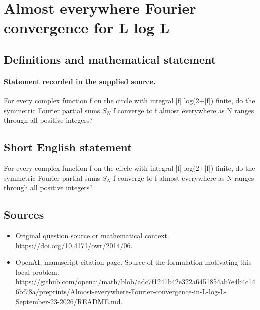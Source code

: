 \documentclass[11pt]{article}
\begin{document}
\section*{Almost everywhere Fourier convergence for L log L}\label{statement}
\subsection{Definitions and mathematical statement}
\paragraph{Statement recorded in the supplied source.}
For every complex function f on the circle with integral |f| log(2+|f|) finite, do the symmetric Fourier partial sums $S_N$ f converge to f almost everywhere as N ranges through all positive integers?
\subsection{Short English statement}
For every complex function f on the circle with integral |f| log(2+|f|) finite, do the symmetric Fourier partial sums $S_N$ f converge to f almost everywhere as N ranges through all positive integers?
\subsection{Sources}
\begin{itemize}
\item[S1] Original question source or mathematical context.
\url{https://doi.org/10.4171/owr/2014/06}.
\item[S2] OpenAI, manuscript citation page. Source of the formulation motivating this local problem.
\url{https://github.com/openai/math/blob/adc7f1241b42e322a6451854ab7e4b4c146bf78a/preprints/Almost-everywhere-Fourier-convergence-in-L-log-L-September-23-2026/README.md}.
\end{itemize}
\end{document}
